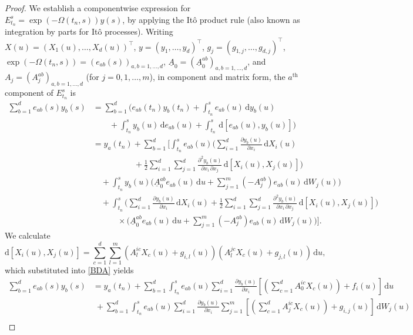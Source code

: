 \documentclass[onefignum]{siamart250211}
\begin{document}
\begin{proof}
We establish a componentwise expression for $E_{t_n}^s=\exp(-\Omega(t_n,s))y(s)$, by applying the It\^o product rule (also known as integration by parts for It\^o processes). Writing $X(u)=(X_1(u),\ldots,X_d(u))^\intercal$, $y=(y_1,\ldots,y_d)^\intercal$, $g_j=(g_{1,j},\ldots,g_{d,j})^\intercal$, $\exp(-\Omega(t_n,s))=(e_{ab}(s))_{a,b=1,\ldots,d}$, $\underline{A}_0=(\underline{A}_0^{ab})_{a,b=1,\ldots,d}$, and $A_j=(A_j^{ab})_{a,b=1,\ldots,d}$ (for $j=0,1,\ldots,m$), in component and matrix form, the $a^\mathrm{th}$ component of $E_{t_n}^s$ is
\begin{align}
\sum_{b=1}^de_{ab}(s)y_b(s)&=\sum_{b=1}^d\bigg(e_{ab}(t_n)y_b(t_n)+\int_{t_n}^se_{ab}(u)\,\mathrm{d}y_b(u)\nonumber\\
&\quad\quad+\int_{t_n}^sy_b(u)\,\mathrm{d}e_{ab}(u)+\int_{t_n}^s\,\mathrm{d}\left[e_{ab}(u),y_b(u)\right]\bigg)\nonumber\\
&=y_a(t_n)+\sum_{b=1}^d\bigg[\int_{t_n}^se_{ab}(u)\bigg(\sum_{i=1}^d\frac{\partial y_b(u)}{\partial x_i}\,\mathrm{d}X_i(u)\label{BDA}\\
&\quad\quad\quad\quad\quad+\frac{1}{2}\sum_{i=1}^d\sum_{j=1}^d\frac{\partial^2y_b(u)}{\partial x_i\,\partial x_j}\,\mathrm{d}\left[X_i(u),X_j(u)\right]\bigg)\nonumber\\
&\quad+\int_{t_n}^sy_b(u)\bigg(\underline{A}_0^{ab}e_{ab}(u)\,\mathrm{d}u+\sum_{j=1}^m\left(-A_j^{ab}\right)e_{ab}(u)\,\mathrm{d}W_j(u)\bigg)\nonumber\\
&\quad+\int_{t_n}^s\bigg(\sum_{i=1}^d\frac{\partial y_b(u)}{\partial x_i}\,\mathrm{d}X_i(u)+\frac{1}{2}\sum_{i=1}^d\sum_{j=1}^d\frac{\partial^2y_b(u)}{\partial x_i\,\partial x_j}\,\mathrm{d}\left[X_i(u),X_j(u)\right]\bigg)\nonumber\\
&\quad\quad\quad\times\bigg(\underline{A}_0^{ab}e_{ab}(u)\,\mathrm{d}u+\sum_{j=1}^m\left(-A_j^{ab}\right)e_{ab}(u)\,\mathrm{d}W_j(u)\bigg)\bigg].\nonumber
\end{align}
We calculate
\[\mathrm{d}[X_i(u),X_j(u)]=\sum_{c=1}^d\sum_{l=1}^m\left(A_l^{ic}X_c(u)+g_{i,l}(u)\right)\left(A_l^{jc}X_c(u)+g_{j,l}(u)\right)\,\mathrm{d}u,\]
which substituted into \cref{BDA} yields
\begin{align}
\sum_{b=1}^de_{ab}(s)y_b(s)&=y_a(t_n)+\sum_{b=1}^d\int_{t_n}^se_{ab}(u)\sum_{i=1}^d\frac{\partial y_b(u)}{\partial x_i}\left[\left(\sum_{c=1}^dA_0^{ic}X_c(u)\right)+f_i(u)\right]\,\mathrm{d}u\nonumber\\
&\;+\sum_{b=1}^d\int_{t_n}^se_{ab}(u)\sum_{i=1}^d\frac{\partial y_b(u)}{\partial x_i}\sum_{j=1}^m\left[\left(\sum_{c=1}^dA_j^{ic}X_c(u)\right)+g_{i,j}(u)\right]\,\mathrm{d}W_j(u)\label{BEA}\\

\end{align}
\end{proof}
\end{document}
